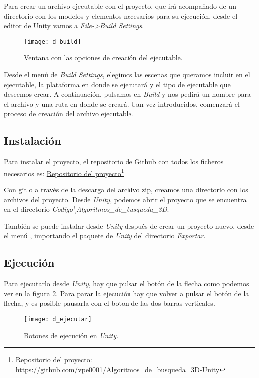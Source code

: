 Para crear un archivo ejecutable con el proyecto, que irá acompañado de un directorio con los modelos y elementos necesarios para su ejecución, desde el editor de Unity vamos a \textit{File-\textgreater Build Settings}.

\begin{figure}[htpb]
    \centering
    \texttt{[image: d\_build]}
    \caption[Menú de creación del ejecutable]{Ventana con las opciones de creación del ejecutable.}
    \label{fig:dbuild}
\end{figure}

Desde el menú de \textit{Build Settings}, elegimos las escenas que queramos incluir en el ejecutable, la plataforma en donde se ejecutará y el tipo de ejecutable que deseemos crear. A continuación, pulsamos en \textit{Build} y nos pedirá un nombre para el archivo y una ruta en donde se creará. Uan vez introducidos, comenzará el proceso de creación del archivo ejecutable.

\subsection{Instalación}\label{dinstalacion}
Para instalar el proyecto, el repositorio de Github con todos los ficheros necesarios es:
\href{https://github.com/vpe0001/Algoritmos\_de\_busqueda\_3D-Unity}{Repositorio del proyecto}\footnote{Repositorio del proyecto: \url{https://github.com/vpe0001/Algoritmos\_de\_busqueda\_3D-Unity}}

Con git o a través de la descarga del archivo zip, creamos una directorio con los archivos del proyecto. Desde \textit{Unity}, podemos abrir el proyecto que se encuentra en el directorio \textit{Codigo\textbackslash Algoritmos\_de\_busqueda\_3D}.

También se puede instalar desde \textit{Unity} después de crear un proyecto nuevo, desde el menú , importando el paquete de \textit{Unity} del directorio \textit{Exportar}.

\subsection{Ejecución}
Para ejecutarlo desde \textit{Unity}, hay que pulsar el botón de la flecha como podemos ver en la figura \ref{fig:dejecutar1}. Para parar la ejecución hay que volver a pulsar el botón de la flecha, y es posible pausarla con el boton de las dos barras verticales.

\begin{figure}[htpb]
    \centering
    \texttt{[image: d\_ejecutar]}
    \caption[Botones de ejecución en \textit{Unity}]{Botones de ejecución en \textit{Unity}.}
    \label{fig:dejecutar1}
\end{figure}

